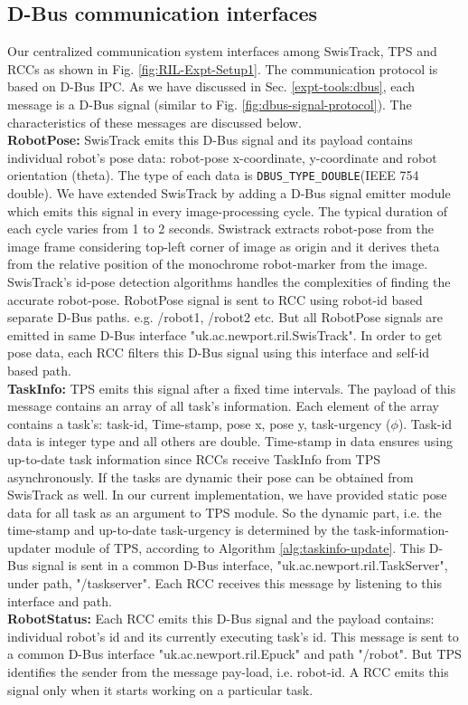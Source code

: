 \subsection{D-Bus communication interfaces}
Our centralized communication system  interfaces among SwisTrack, TPS and RCCs as shown in Fig. \ref{fig:RIL-Expt-Setup1}. The communication protocol is based on D-Bus IPC. As we have discussed in Sec. \ref{expt-tools:dbus}, each message is a D-Bus signal (similar to Fig. \ref{fig:dbus-signal-protocol}). The characteristics of these messages are discussed below.\\
\textbf{RobotPose:} SwisTrack emits this D-Bus signal and its payload contains individual robot's pose data: robot-pose x-coordinate,  y-coordinate and robot orientation (theta). The type of each data is \texttt{DBUS\_TYPE\_DOUBLE}(IEEE 754 double). We have extended SwisTrack  by adding a D-Bus signal emitter module which emits this signal in every image-processing cycle. The typical duration of each cycle varies from 1 to 2 seconds.  Swistrack extracts robot-pose from the image frame considering top-left corner of image as origin and it derives  theta from the relative position of the monochrome robot-marker from the image. SwisTrack's id-pose detection algorithms handles the complexities of finding the accurate robot-pose. RobotPose signal is sent to RCC using robot-id based separate D-Bus paths. e.g. /robot1, /robot2 etc.  But all RobotPose signals are emitted in same D-Bus interface "uk.ac.newport.ril.SwisTrack". In order to get pose data, each RCC filters this D-Bus signal using this interface and self-id based path.\\
\textbf{TaskInfo:} TPS emits this signal after a fixed time intervals. The payload of this message contains an array of all task's information. Each element of the array contains a task's: task-id, Time-stamp, pose x, pose y, task-urgency ($\phi$). Task-id data is integer type and  all others are double. Time-stamp in data ensures using up-to-date task information since RCCs receive TaskInfo from TPS asynchronously. If the tasks are dynamic their pose can be obtained from SwisTrack as well. In our current implementation, we have provided static pose data for all task as an argument to TPS module. So the dynamic part, i.e. the time-stamp and up-to-date task-urgency is determined by the task-information-updater module of TPS, according to Algorithm \ref{alg:taskinfo-update}. This D-Bus signal is sent in a common D-Bus interface, "uk.ac.newport.ril.TaskServer", under path, "/taskserver".  Each RCC receives this message by listening to this interface and path.\\
\textbf{RobotStatus:} Each RCC emits this D-Bus signal and the payload contains: individual robot's id and its currently executing task's id. This message is sent to a common D-Bus interface "uk.ac.newport.ril.Epuck" and path "/robot".  But TPS identifies the sender from the message pay-load, i.e. robot-id. A RCC emits this signal only when it starts working on a particular task. 
